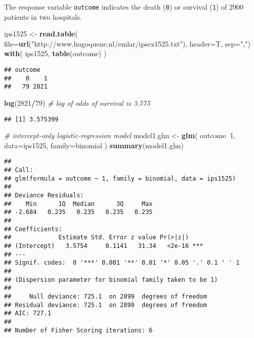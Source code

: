 \documentclass[]{book}
\newenvironment{Shaded}{\begin{snugshade}}{\end{snugshade}}
\newcommand{\CommentTok}[1]{\textcolor[rgb]{0.56,0.35,0.01}{\textit{#1}}}
\newcommand{\DataTypeTok}[1]{\textcolor[rgb]{0.13,0.29,0.53}{#1}}
\newcommand{\DecValTok}[1]{\textcolor[rgb]{0.00,0.00,0.81}{#1}}
\newcommand{\KeywordTok}[1]{\textcolor[rgb]{0.13,0.29,0.53}{\textbf{#1}}}
\newcommand{\NormalTok}[1]{#1}
\newcommand{\OperatorTok}[1]{\textcolor[rgb]{0.81,0.36,0.00}{\textbf{#1}}}
\newcommand{\StringTok}[1]{\textcolor[rgb]{0.31,0.60,0.02}{#1}}
\begin{document}
The response variable \texttt{outcome} indicates
the death (\texttt{0}) or survival
(\texttt{1}) of 2900 patients in two hospitals.

\begin{Shaded}
\begin{Highlighting}[]
\NormalTok{ips1525 <-}\StringTok{ }\KeywordTok{read.table}\NormalTok{( }
  \DataTypeTok{file=}\KeywordTok{url}\NormalTok{(}\StringTok{"http://www.hugoquene.nl/emlar/ipsex1525.txt"}\NormalTok{),}
  \DataTypeTok{header=}\NormalTok{T, }\DataTypeTok{sep=}\StringTok{","}\NormalTok{) }
\KeywordTok{with}\NormalTok{( ips1525, }\KeywordTok{table}\NormalTok{(outcome) ) }
\end{Highlighting}
\end{Shaded}

\begin{verbatim}
## outcome
##    0    1 
##   79 2821
\end{verbatim}

\begin{Shaded}
\begin{Highlighting}[]
\KeywordTok{log}\NormalTok{(}\DecValTok{2821}\OperatorTok{/}\DecValTok{79}\NormalTok{) }\CommentTok{# log of odds of survival is 3.575}
\end{Highlighting}
\end{Shaded}

\begin{verbatim}
## [1] 3.575399
\end{verbatim}

\begin{Shaded}
\begin{Highlighting}[]
\CommentTok{# intercept-only logistic-regression model}
\NormalTok{model1.glm <-}\StringTok{ }\KeywordTok{glm}\NormalTok{( outcome}\OperatorTok{~}\DecValTok{1}\NormalTok{, }\DataTypeTok{data=}\NormalTok{ips1525, }\DataTypeTok{family=}\NormalTok{binomial )}
\KeywordTok{summary}\NormalTok{(model1.glm) }
\end{Highlighting}
\end{Shaded}

\begin{verbatim}
## 
## Call:
## glm(formula = outcome ~ 1, family = binomial, data = ips1525)
## 
## Deviance Residuals: 
##    Min      1Q  Median      3Q     Max  
## -2.684   0.235   0.235   0.235   0.235  
## 
## Coefficients:
##             Estimate Std. Error z value Pr(>|z|)    
## (Intercept)   3.5754     0.1141   31.34   <2e-16 ***
## ---
## Signif. codes:  0 '***' 0.001 '**' 0.01 '*' 0.05 '.' 0.1 ' ' 1
## 
## (Dispersion parameter for binomial family taken to be 1)
## 
##     Null deviance: 725.1  on 2899  degrees of freedom
## Residual deviance: 725.1  on 2899  degrees of freedom
## AIC: 727.1
## 
## Number of Fisher Scoring iterations: 6
\end{verbatim}
\end{document}
